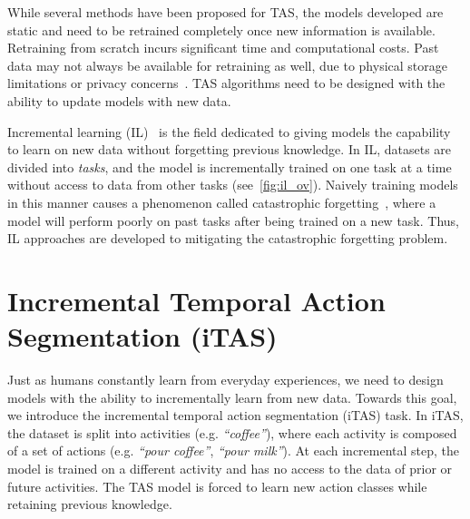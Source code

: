 
While several methods have been proposed for TAS, the models developed are static and need to be retrained completely once new information is available. Retraining from scratch incurs significant time and computational costs. Past data may not always be available for retraining as well, due to physical storage limitations or privacy concerns~\cite{delange_cil_survey_2022}. TAS algorithms need to be designed with the ability to update models with new data.



Incremental learning (IL)~\cite{delange_cil_survey_2022} is the field dedicated to giving models the capability to learn on new data without forgetting previous knowledge. In IL, datasets are divided into \emph{tasks}, and the model is incrementally trained on one task at a time without access to data from other tasks (see~\cref{fig:il_ov}). Naively training models in this manner causes a phenomenon called catastrophic forgetting~\cite{french1999catastrophic}, where a model will perform poorly on past tasks after being trained on a new task. Thus, IL approaches are developed to mitigating the catastrophic forgetting problem. 

\section{Incremental Temporal Action Segmentation (iTAS)}

Just as humans constantly learn from everyday experiences, we need to design models with the ability to incrementally learn from new data. Towards this goal, we introduce the incremental temporal action segmentation (iTAS) task. In iTAS, the dataset is split into activities (e.g. \emph{``coffee''}), where each activity is composed of a set of actions (e.g. \emph{``pour coffee''}, \emph{``pour milk''}). At each incremental step, the model is trained on a different activity and has no access to the data of prior or future activities. The TAS model is forced to learn new action classes while retaining previous knowledge.


